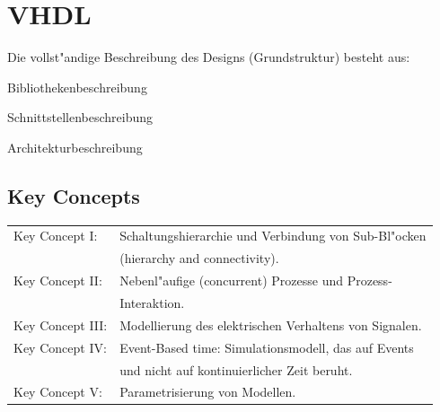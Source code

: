 \section{VHDL}
\begin{minipage}{0.4\textwidth}
	Die vollst"andige Beschreibung des Designs (Grundstruktur) besteht aus:
	\begin{description}
	\setlength{\itemsep}{0pt}
  	\setlength{\parskip}{0pt}
  	\setlength{\parsep}{0pt}
		\item [library:] Bibliothekenbeschreibung
		\item [entity:] Schnittstellenbeschreibung
		\item [architecture:] Architekturbeschreibung
	\end{description}
	\vfill\null
\end{minipage}
\begin{minipage}{0.59\textwidth}
	\subsection{Key Concepts}
		\begin{tabular}{ll}
			Key Concept I: & Schaltungshierarchie und Verbindung von Sub-Bl"ocken\\
			& (hierarchy and connectivity).\\
			Key Concept II: & Nebenl"aufige (concurrent) Prozesse und Prozess-\\
			& Interaktion.\\
			Key Concept III: & Modellierung des elektrischen Verhaltens von Signalen.\\
			Key Concept IV: & Event-Based time: Simulationsmodell, das auf Events\\
			& und nicht auf kontinuierlicher Zeit beruht.\\
			Key Concept V: & Parametrisierung von Modellen.
		\end{tabular}
	\vfill\null
\end{minipage}

